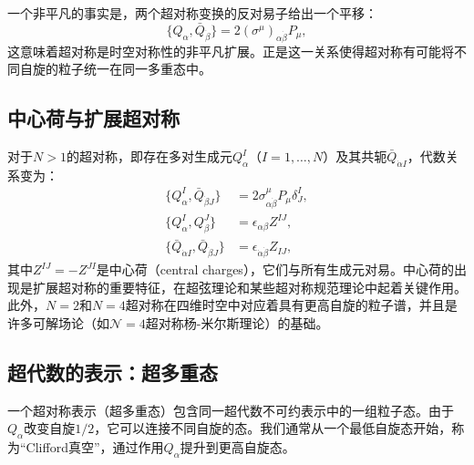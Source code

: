 一个非平凡的事实是，两个超对称变换的反对易子给出一个平移：
\begin{equation}
\{ Q_\alpha, \bar Q_{\dot\beta} \} = 2 (\sigma^\mu)_{\alpha\dot\beta} P_\mu,
\end{equation}
这意味着超对称是时空对称性的非平凡扩展。正是这一关系使得超对称有可能将不同自旋的粒子统一在同一多重态中。

\subsection*{中心荷与扩展超对称}

对于$N>1$的超对称，即存在多对生成元$Q_\alpha^I$（$I=1,\dots,N$）及其共轭$\bar Q_{\dot\alpha I}$，代数关系变为：
\begin{align}
\{ Q_\alpha^I, \bar Q_{\dot\beta J} \} &= 2 \sigma^\mu_{\alpha\dot\beta} P_\mu \delta^I_J, \\
\{ Q_\alpha^I, Q_\beta^J \} &= \epsilon_{\alpha\beta} Z^{IJ}, \\
\{\bar Q_{\dot\alpha I}, \bar Q_{\dot\beta J}\} &= \epsilon_{\dot\alpha\dot\beta} Z_{IJ},
\end{align}
其中$Z^{IJ} = -Z^{JI}$是中心荷（central charges），它们与所有生成元对易。中心荷的出现是扩展超对称的重要特征，在超弦理论和某些超对称规范理论中起着关键作用。此外，$N=2$和$N=4$超对称在四维时空中对应着具有更高自旋的粒子谱，并且是许多可解场论（如$\mathcal{N}=4$超对称杨-米尔斯理论）的基础。

\subsection*{超代数的表示：超多重态}

一个超对称表示（超多重态）包含同一超代数不可约表示中的一组粒子态。由于$Q_\alpha$改变自旋$1/2$，它可以连接不同自旋的态。我们通常从一个最低自旋态开始，称为“Clifford真空”，通过作用$Q_\alpha$提升到更高自旋态。

